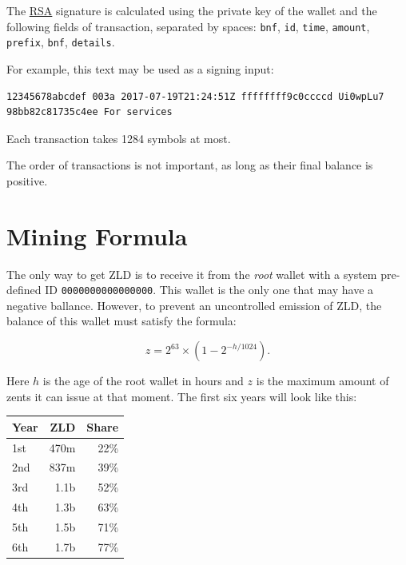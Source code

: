 \documentclass[11pt,oneside]{article}
\newcommand\dd[1]{\colorbox{gray!30}{\texttt{#1}}}
\begin{document}
The \href{https://en.wikipedia.org/wiki/RSA_(cryptosystem)}{RSA}
signature is calculated using the private key of the
wallet and the following fields of transaction, separated by spaces:
\dd{bnf}, \dd{id}, \dd{time}, \dd{amount}, \dd{prefix}, \dd{bnf}, \dd{details}.

For example, this text may be used as a signing input:

\begin{verbatim}
12345678abcdef 003a 2017-07-19T21:24:51Z ffffffff9c0ccccd Ui0wpLu7 98bb82c81735c4ee For services
\end{verbatim}

Each transaction takes 1284 symbols at most.

The order of transactions is not important, as long as their final balance is positive.

\section{Mining Formula}

The only way to get ZLD is to receive it from the \emph{root} wallet
with a system pre-defined ID \dd{0000000000000000}.
This wallet is the only one that may have a negative ballance.
However, to prevent an uncontrolled emission of ZLD, the balance
of this wallet must satisfy the formula:

$$z = 2^{63} \times (1 - 2^{-h/1024}).$$

Here $h$ is the age of the root wallet in hours and $z$ is the maximum
amount of zents it can issue at that moment. The first
six years will look like this:

\vspace{\parskip}\begin{center}\begin{tabular}{lrr}
\hline
Year & ZLD & Share \\
\hline
1st & 470m & 22\% \\
2nd & 837m & 39\% \\
3rd & 1.1b & 52\%\\
4th & 1.3b & 63\% \\
5th & 1.5b & 71\% \\
6th & 1.7b & 77\% \\
\hline
\end{tabular}\end{center}
\end{document}
